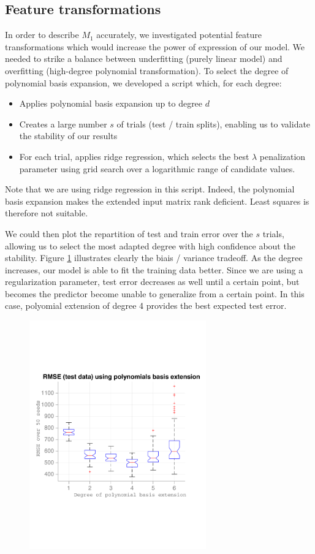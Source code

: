 \documentclass{article} %
\begin{document}
  \subsection{Feature transformations}
  In order to describe $M_1$ accurately, we investigated potential feature transformations which would increase the power of expression of our model. We needed to strike a balance between underfitting (purely linear model) and overfitting (high-degree polynomial transformation). To select the degree of polynomial basis expansion, we developed a script which, for each degree:
  \begin{itemize}
    \item Applies polynomial basis expansion up to degree $d$
    \item Creates a large number $s$ of trials (test / train splits), enabling us to validate the stability of our results
    \item For each trial, applies ridge regression, which selects the best $\lambda$ penalization parameter using grid search over a logarithmic range of candidate values.
  \end{itemize}

  Note that we are using ridge regression in this script. Indeed, the polynomial basis expansion makes the extended input matrix rank deficient. Least squares is therefore not suitable.

  We could then plot the repartition of test and train error over the $s$ trials, allowing us to select the most adapted degree with high confidence about the stability. Figure \ref{fig:basisExpansionTestError} illustrates clearly the biais / variance tradeoff. As the degree increases, our model is able to fit the training data better. Since we are using a regularization parameter, test error decreases as well until a certain point, but becomes the predictor become unable to generalize from a certain point. In this case, polyomial extension of degree 4 provides the best expected test error.

  \begin{figure}[h]
    \center
    \includegraphics[width=3in]{figures/regression/basis-extension-test-error.pdf}
    \caption{}
    \label{fig:basisExpansionTestError}
  \end{figure}
\end{document}
